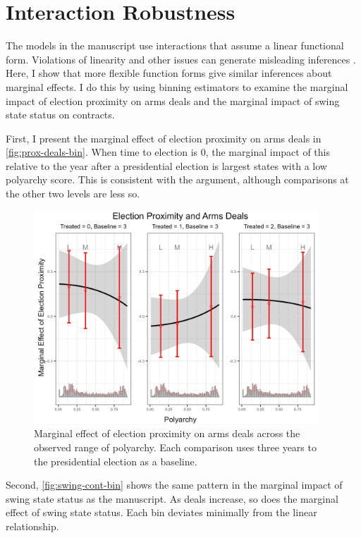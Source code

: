 \documentclass[12pt]{article}
\begin{document}

\section{Interaction Robustness}

The models in the manuscript use interactions that assume a linear functional form. 
Violations of linearity and other issues can generate misleading inferences \citep{Hainmuelleretal2019}. 
Here, I show that more flexible function forms give similar inferences about marginal effects. 
I do this by using binning estimators to examine the marginal impact of election proximity on arms deals and the marginal impact of swing state status on contracts.


First, I present the marginal effect of election proximity on arms deals in \autoref{fig:prox-deals-bin}.
When time to election is 0, the marginal impact of this relative to the year after a presidential election is largest states with a low polyarchy score. 
This is consistent with the argument, although comparisons at the other two levels are less so. 



\begin{figure}[htpb]
	\centering
		\includegraphics[width=0.95\textwidth]{prox-deals-bin.png}
	\caption{Marginal effect of election proximity on arms deals across the observed range of polyarchy. Each comparison uses three years to the presidential election as a baseline.}
	\label{fig:prox-deals-bin}
\end{figure}


Second, \autoref{fig:swing-cont-bin} shows the same pattern in the marginal impact of swing state status as the manuscript. 
As deals increase, so does the marginal effect of swing state status. 
Each bin deviates minimally from the linear relationship. 
\end{document}
